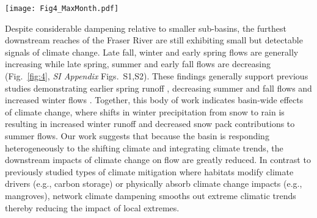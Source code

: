 \documentclass[9pt,twocolumn,twoside,lineno]{pnas-new}
\begin{document}
\begin{figure*}[h]
\centering
\texttt{[image: Fig4\_MaxMonth.pdf]}
	\caption{Monthly maximum flow trend attenuation within the Fraser River basin. (\textbf{Left}) Fraser River's basin-wide maximum-flow trend estimates (i.e., intercept = vertical grey lines) by month with density distributions of null-model simulations. Observed values falling further from the center of the density distribution suggest greater evidence for changes in maximum flow and a greater shift in magnitude. (\textbf{Center}) Observed monthly Fraser River maximum-flow variance exponent ($\hat{\updelta}$, blue) and associated density distribution of simulated $\hat{\updelta}$ estimates. Decimal values represent the percent of simulated data exhibiting weaker attenuation (yellow) than observed. (\textbf{Right}) Trend estimates $\pm$ one standard error (SE, grey) plotted against watershed area (km\textsuperscript{2}), colored by climate portfolio strength (green = small, blue = large), for four seasonally representative months. These reflect months in the prior columns and describe the variation in percent change per decade of maximum flow among sites. Simulated lines ignore variance in the intercept and slope to focus visually on attenuation.}
\label{fig:4}
\end{figure*}

Despite considerable dampening relative to smaller sub-basins, the furthest downstream reaches of the Fraser River are still exhibiting small but detectable signals of climate change. Late fall, winter and early spring flows are generally increasing while late spring, summer and early fall flows are decreasing (Fig.~\ref{fig:4}, \textit{SI Appendix} Figs.~S1,S2). These findings generally support previous studies demonstrating earlier spring runoff \cite{Dery:2012}, decreasing summer and fall flows \cite{Stahl:2006} and increased winter flows \cite{Healey:2011}. Together, this body of work indicates basin-wide effects of climate change, where shifts in winter precipitation from snow to rain is resulting in increased winter runoff and decreased snow pack contributions to summer flows. Our work suggests that because the basin is responding heterogeneously to the shifting climate and integrating climate trends, the downstream impacts of climate change on flow are greatly reduced. In contrast to previously studied types of climate mitigation where habitats modify climate drivers (e.g., carbon storage) or physically absorb climate change impacts (e.g., mangroves), network climate dampening smooths out extreme climatic trends thereby reducing the impact of local extremes.
\end{document}
